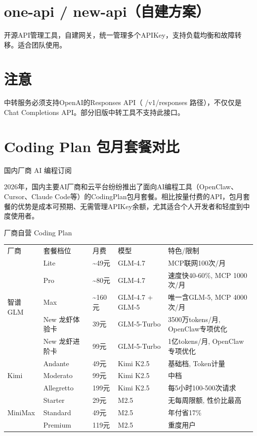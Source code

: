 \documentclass[
  10
]{article}
\newcounter{none} %
\begin{document}
\section{one-api /
new-api（自建方案）}\label{one-api-new-apiux81eaux5efaux65b9ux6848}

开源API管理工具，自建网关，统一管理多个APIKey，支持负载均衡和故障转移。适合团队使用。

\section{注意}\label{ux6ce8ux610f-18}

中转服务必须支持OpenAI的Responses API（ /v1/responses
路径），不仅仅是Chat Completions API。部分旧版中转工具不支持此接口。

\section{Coding Plan
包月套餐对比}\label{coding-plan-ux5305ux6708ux5957ux9910ux5bf9ux6bd4}

国内⼚商 AI 编程订阅

2026年，国内主要AI厂商和云平台纷纷推出了面向AI编程工具（OpenClaw、Cursor、Claude
Code等）的CodingPlan包月套餐。相比按量付费的API，包月套餐的优势是成本可预期、无需管理APIKey余额，尤其适合个人开发者和轻度到中度使用者。

厂商自营 Coding Plan

{\def\LTcaptype{none} %
\begin{longtable}[]{@{}lllll@{}}
\toprule\noalign{}
\endhead
\bottomrule\noalign{}
\endlastfoot
厂商 & 套餐档位 & 月费 & 模型 & 特色/限制 \\
\multirow{5}{*}{智谱GLM} & Lite & \textasciitilde49元 & GLM-4.7 &
MCP联网100次/月 \\
& Pro & \textasciitilde80元 & GLM-4.7 & 速度快40-60\%, MCP 1000次/月 \\
& Max & \textasciitilde160元 & GLM-4.7 + GLM-5 & 唯一含GLM-5, MCP
4000次/月 \\
& New 龙虾体验卡 & 39元 & GLM-5-Turbo & 3500万tokens/月,
OpenClaw专项优化 \\
& New 龙虾进阶卡 & 99元 & GLM-5-Turbo & 1亿tokens/月,
OpenClaw专项优化 \\
\multirow{3}{*}{Kimi} & Andante & 49元 & Kimi K2.5 & 基础档,
Token计量 \\
& Moderato & 99元 & Kimi K2.5 & 中档 \\
& Allegretto & 199元 & Kimi K2.5 & 每5小时100-500次请求 \\
\multirow{3}{*}{MiniMax} & Starter & 29元 & M2.5 & 无每周限额,
性价比最高 \\
& Standard & 49元 & M2.5 & 年付省17\% \\
& Premium & 119元 & M2.5 & 重度用户 \\
\end{longtable}
}
\end{document}
